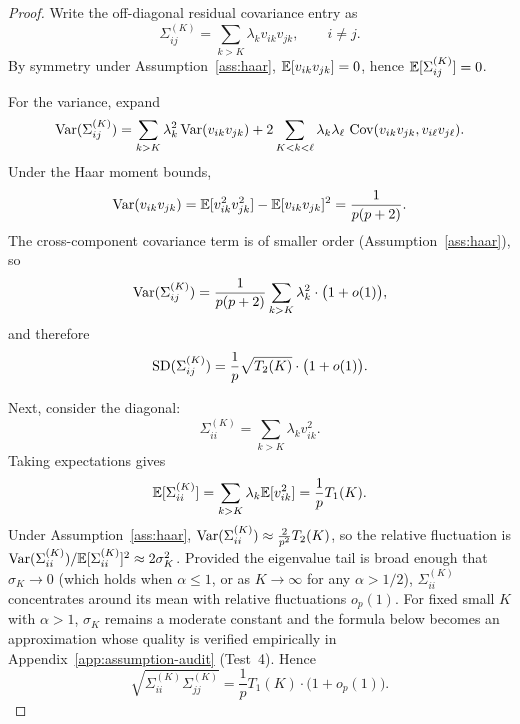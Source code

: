 \begin{proof}
Write the off-diagonal residual covariance entry as
\begin{equation}
\Sigma^{(K)}_{ij}=\sum_{k>K}\lambda_k v_{ik}v_{jk},\qquad i\neq j.
\end{equation}
By symmetry under Assumption~\ref{ass:haar}, $\mathbb{E}[v_{ik}v_{jk}]=0$, hence $\mathbb{E}[\Sigma^{(K)}_{ij}]=0$.

For the variance, expand
\begin{equation}
\operatorname{Var}(\Sigma^{(K)}_{ij})
= \sum_{k>K}\lambda_k^2 \operatorname{Var}(v_{ik}v_{jk})
+ 2\sum_{K<k<\ell}\lambda_k\lambda_\ell\,\operatorname{Cov}(v_{ik}v_{jk},v_{i\ell}v_{j\ell}).
\end{equation}
Under the Haar moment bounds,
\begin{equation}
\operatorname{Var}(v_{ik}v_{jk})=\mathbb{E}[v_{ik}^2v_{jk}^2]-\mathbb{E}[v_{ik}v_{jk}]^2=\frac{1}{p(p+2)}.
\end{equation}
The cross-component covariance term is of smaller order (Assumption~\ref{ass:haar}),
so
\begin{equation}
\operatorname{Var}(\Sigma^{(K)}_{ij})=\frac{1}{p(p+2)}\sum_{k>K}\lambda_k^2\cdot \bigl(1+o(1)\bigr),
\end{equation}
and therefore
\begin{equation}
\operatorname{SD}(\Sigma^{(K)}_{ij})=\frac{1}{p}\sqrt{T_2(K)}\cdot \bigl(1+o(1)\bigr).
\end{equation}

Next, consider the diagonal:
\begin{equation}
\Sigma^{(K)}_{ii}=\sum_{k>K}\lambda_k v_{ik}^2.
\end{equation}
Taking expectations gives
\begin{equation}
\mathbb{E}[\Sigma^{(K)}_{ii}]=\sum_{k>K}\lambda_k\mathbb{E}[v_{ik}^2]=\frac{1}{p}T_1(K).
\end{equation}
Under Assumption~\ref{ass:haar}, $\operatorname{Var}(\Sigma^{(K)}_{ii})\approx\frac{2}{p^2}T_2(K)$,
so the relative fluctuation is $\operatorname{Var}(\Sigma^{(K)}_{ii})/\mathbb{E}[\Sigma^{(K)}_{ii}]^2\approx 2\sigma_K^2$.
Provided the eigenvalue tail is broad enough that $\sigma_K\to 0$
(which holds when $\alpha\le 1$, or as $K\to\infty$ for any $\alpha>1/2$),
$\Sigma^{(K)}_{ii}$ concentrates around its mean with relative fluctuations $o_p(1)$.
For fixed small $K$ with $\alpha>1$, $\sigma_K$ remains a moderate constant and the
formula below becomes an approximation whose quality is verified empirically in
Appendix~\ref{app:assumption-audit} (Test~4).
Hence
\begin{equation}
\sqrt{\Sigma^{(K)}_{ii}\Sigma^{(K)}_{jj}}=\frac{1}{p}T_1(K)\cdot \bigl(1+o_p(1)\bigr).
\end{equation}


\end{proof}
